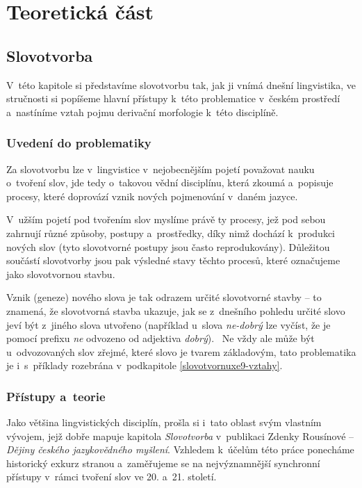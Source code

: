 \part{Teoretická část}

\hypertarget{slovotvorba}{%
\chapter{Slovotvorba}\label{slovotvorba}}

V~této kapitole si představíme slovotvorbu tak, jak ji vnímá dnešní
lingvistika, ve stručnosti si popíšeme hlavní přístupy k~této
problematice v~českém prostředí a~nastíníme vztah pojmu derivační
morfologie k~této disciplíně.

\hypertarget{uvedenuxed-do-problematiky}{%
\section{Uvedení do problematiky}\label{uvedenuxed-do-problematiky}}

Za slovotvorbu lze v~lingvistice v~nejobecnějším pojetí považovat nauku
o~tvoření slov, jde tedy o~takovou vědní disciplínu, která zkoumá
a~popisuje procesy, které doprovází vznik nových pojmenování v~daném
jazyce.

V~užším pojetí pod tvořením slov myslíme právě ty procesy, jež pod sebou
zahrnují různé způsoby, postupy a~prostředky, díky nimž dochází
k~produkci nových slov (tyto slovotvorné postupy jsou často
reprodukovány). Důležitou součástí slovotvorby jsou pak výsledné stavy
těchto procesů, které označujeme jako slovotvornou stavbu.
\parencite[92]{dokulil00}

Vznik (geneze) nového slova je tak odrazem určité slovotvorné stavby --
to znamená, že slovotvorná stavba ukazuje, jak se z~dnešního pohledu
určité slovo jeví být z~jiného slova utvořeno (například u~slova
\emph{ne-dobrý} lze vyčíst, že je pomocí prefixu \emph{ne} odvozeno od
adjektiva \emph{dobrý}).~\parencite[92--93]{dokulil00} Ne vždy ale může
být u~odvozovaných slov zřejmé, které slovo je tvarem základovým, tato
problematika je i~s~příklady rozebrána v~podkapitole
\ref{slovotvornuxe9-vztahy}.

\hypertarget{pux159uxedstupy-a-teorie}{%
\section{Přístupy a~teorie}\label{pux159uxedstupy-a-teorie}}

Jako většina lingvistických disciplín, prošla si i~tato oblast svým
vlastním vývojem, jejž dobře mapuje kapitola \emph{Slovotvorba}
v~publikaci Zdenky Rousínové -- \emph{Dějiny českého jazykovědného
myšlení}. Vzhledem k~účelům této práce ponecháme historický exkurz
stranou a~zaměřujeme se na nejvýznamnější synchronní přístupy v~rámci
tvoření slov ve 20. a~21. století.

